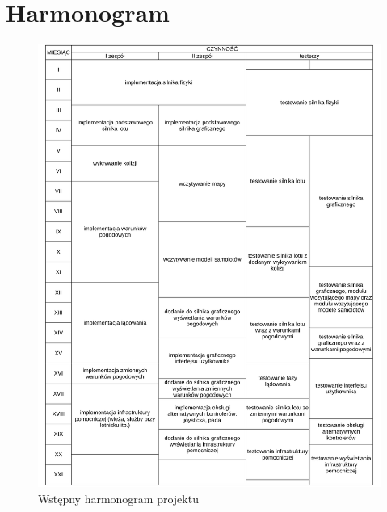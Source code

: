 \documentclass{mwrep}
\begin{document}
\chapter{Harmonogram}
\begin{figure}[h]
\centering
\centerline{\includegraphics[scale=0.6]{harmonogram-tabela.pdf}}
\caption{Wstępny harmonogram projektu}
\end{figure}
\end{document}
